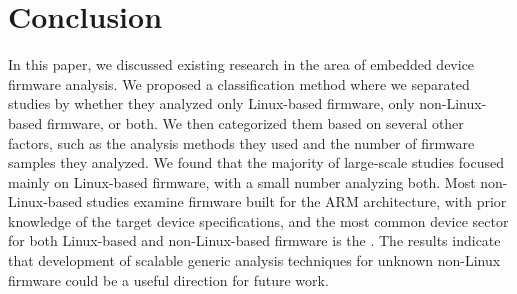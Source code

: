 \section{Conclusion}\label{s:conclusion}
In this paper, we discussed existing research in the area of embedded device firmware analysis.
We proposed a classification method where we separated studies by whether they analyzed only Linux-based firmware, only non-Linux-based firmware, or both.
We then categorized them based on several other factors, such as the analysis methods they used and the number of firmware samples they analyzed.
We found that the majority of large-scale studies focused mainly on Linux-based firmware, with a small number analyzing both.
Most non-Linux-based studies examine firmware built for the ARM architecture, with prior knowledge of the target device specifications, and the most common device sector for both Linux-based and non-Linux-based firmware is the .
The results indicate that development of scalable generic analysis techniques for unknown non-Linux firmware could be a useful direction for future work.
